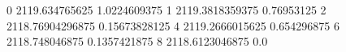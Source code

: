 0 2119.634765625 1.0224609375
1 2119.3818359375 0.76953125
2 2118.76904296875 0.15673828125
4 2119.2666015625 0.654296875
6 2118.748046875 0.1357421875
8 2118.6123046875 0.0
